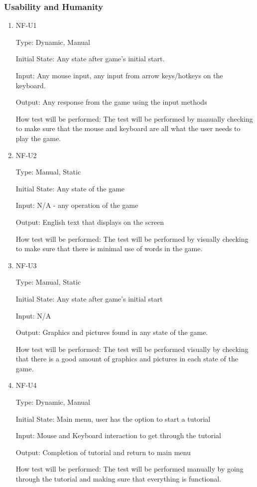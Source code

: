 \documentclass[12pt, titlepage]{article}
\begin{document}
\subsubsection{Usability and Humanity}
\begin{enumerate}

\item{NF-U1\\}

Type: Dynamic, Manual
					
Initial State: Any state after game's initial start.
					
Input: Any mouse input, any input from arrow keys/hotkeys on the keyboard.
					
Output: Any response from the game using the input methods 
					
How test will be performed: The test will be performed by manually checking to make sure that the mouse and keyboard are all what the user needs to play the game.

\item{NF-U2\\}

Type: Manual, Static 
					
Initial State: Any state of the game
					
Input: N/A - any operation of the game
					
Output: English text that displays on the screen
					
How test will be performed: The test will be performed by visually checking to make sure that there is minimal use of words in the game.

\item{NF-U3\\}

Type:  Manual, Static
					
Initial State: Any state after game's initial start 
					
Input: N/A 
					
Output: Graphics and pictures found in any state of the game.
					
How test will be performed: The test will be performed visually by 
checking that there is a good amount of graphics and pictures in each state of the game.

\item{NF-U4\\}

Type:  Dynamic, Manual
					
Initial State: Main menu, user has the option to start a tutorial
					
Input: Mouse and Keyboard interaction to get through the tutorial
					
Output: Completion of tutorial and return to main menu
					
How test will be performed: The test will be performed manually by going through the tutorial and making sure that everything is functional.


\end{enumerate}
\end{document}
